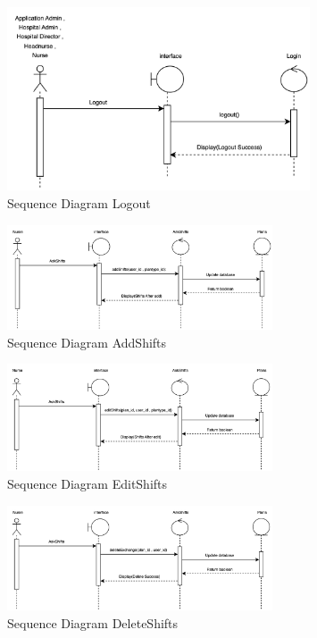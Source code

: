 \begin{figure}[h]
    \centering
    \includegraphics[width=0.8\textwidth]{Sequence 1.3.png}
    \caption{Sequence Diagram Logout}
    \end{figure}



    \begin{figure}[h]
    \centering
    \includegraphics[width=0.7\textwidth]{Sequence 2.1.png}
    \caption{Sequence Diagram AddShifts}
    \end{figure}

    \begin{figure}[h]
    \centering
    \includegraphics[width=0.7\textwidth]{Sequence 2.2.png}
    \caption{Sequence Diagram EditShifts}
    \end{figure}

    \begin{figure}[h]
    \centering
    \includegraphics[width=0.7\textwidth]{Sequence 2.3.png}
    \caption{Sequence Diagram DeleteShifts}
    \end{figure}

